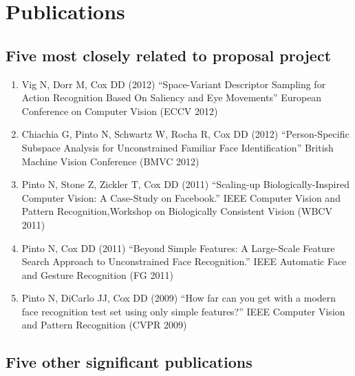\documentclass{nsfproposal}
\begin{document}
\section{Publications}

\subsection{Five most closely related to proposal project}

\begin{enumerate}

\item Vig N, Dorr M, Cox DD (2012)
``Space-Variant Descriptor Sampling for Action Recognition Based On Saliency and Eye Movements''
European Conference on Computer Vision (ECCV 2012)

\item Chiachia G, Pinto N, Schwartz W, Rocha R,   Cox DD (2012)
``Person-Specific Subspace Analysis for Unconstrained Familiar Face Identification''
British Machine Vision Conference (BMVC 2012)

\item Pinto N, Stone Z, Zickler T, Cox DD (2011)
``Scaling-up Biologically-Inspired Computer Vision: A Case-Study on Facebook.''
IEEE Computer Vision and Pattern Recognition,Workshop on Biologically Consistent Vision (WBCV 2011)

\item Pinto N, Cox DD (2011)
``Beyond Simple Features: A Large-Scale Feature Search Approach to Unconstrained Face Recognition.''
IEEE Automatic Face and Gesture Recognition (FG 2011)

\item Pinto N, DiCarlo JJ, Cox DD (2009)
``How far can you get with a modern face recognition test set using only simple features?''
IEEE Computer Vision and Pattern Recognition (CVPR 2009)

\end{enumerate}


\subsection{Five other significant publications}
\end{document}
